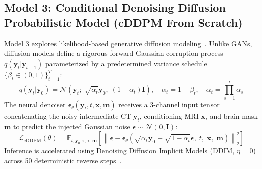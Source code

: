 \subsection{Model 3: Conditional Denoising Diffusion Probabilistic Model (cDDPM From Scratch)}
Model 3 explores likelihood-based generative diffusion modeling~\cite{ho2020denoising,saharia2022palette}. Unlike GANs, diffusion models define a rigorous forward Gaussian corruption process $q(\mathbf{y}_t | \mathbf{y}_{t-1})$ parameterized by a predetermined variance schedule $\{\beta_t \in (0, 1)\}_{t=1}^T$:
\begin{equation}
q(\mathbf{y}_t | \mathbf{y}_0) = \mathcal{N}\left(\mathbf{y}_t; \; \sqrt{\bar{\alpha}_t} \mathbf{y}_0, \; (1 - \bar{\alpha}_t) \mathbf{I}\right), \quad \alpha_t = 1 - \beta_t, \quad \bar{\alpha}_t = \prod_{s=1}^t \alpha_s
\label{eq:m3_forward_diff}
\end{equation}
The neural denoiser $\boldsymbol{\epsilon}_\theta(\mathbf{y}_t, t, \mathbf{x}, \mathbf{m})$ receives a 3-channel input tensor concatenating the noisy intermediate CT $\mathbf{y}_t$, conditioning MRI $\mathbf{x}$, and brain mask $\mathbf{m}$ to predict the injected Gaussian noise $\boldsymbol{\epsilon} \sim \mathcal{N}(\mathbf{0}, \mathbf{I})$:
\begin{equation}
\mathcal{L}_{\text{cDDPM}}(\theta) = \mathbb{E}_{t, \mathbf{y}_0, \boldsymbol{\epsilon}, \mathbf{x}, \mathbf{m}} \left[ \left\| \boldsymbol{\epsilon} - \boldsymbol{\epsilon}_\theta\left( \sqrt{\bar{\alpha}_t}\mathbf{y}_0 + \sqrt{1 - \bar{\alpha}_t}\boldsymbol{\epsilon}, \; t, \; \mathbf{x}, \; \mathbf{m} \right) \right\|_2^2 \right]
\label{eq:m3_cddpm_loss}
\end{equation}
Inference is accelerated using Denoising Diffusion Implicit Models (DDIM, $\eta = 0$) across 50 deterministic reverse steps~\cite{song2021denoising}.

